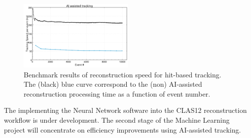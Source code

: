 \begin{figure}
\centering
\includegraphics[width=0.5\textwidth]{pics/nn2.png}
\caption{Benchmark results of reconstruction speed for hit-based tracking.  
The (black) blue curve correspond to the (non) AI-assisted reconstruction processing time as a function of event number. 
}
\label{fig:nn2}
\end{figure}

The implementing the Neural Network software into the CLAS12 reconstruction workflow is under development. The second stage of the Machine Learning project will concentrate on efficiency improvements using AI-assisted tracking.

